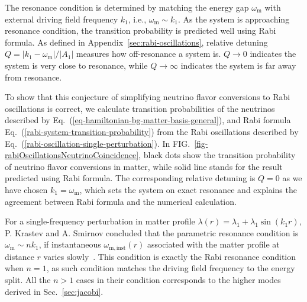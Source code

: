 \documentclass[%
reprint,
 amsmath,amssymb,
 aps,
]{revtex4-1}
\begin{document}
The resonance condition is determined by matching the energy gap $\omega_{\mathrm m}$ with external driving field frequency $k_1$, i.e., $\omega_{\mathrm m} \sim k_1$. As the system is approaching resonance condition, the transition probability is predicted well using Rabi formula. As defined in Appendix~\ref{sec:rabi-oscillations}, relative detuning $Q=\lvert k_1 - \omega_{\mathrm m} \rvert /\lvert A_1 \rvert$ measures how off-resonance a system is. $Q\to 0$ indicates the system is very close to resonance, while $Q\to \infty$ indicates the system is far away from resonance.


To show that this conjecture of simplifying neutrino flavor conversions to Rabi oscillations is correct, we calculate transition probabilities of the neutrinos described by Eq.~(\ref{eq-hamiltonian-bg-matter-basis-general}), and Rabi formula Eq.~(\ref{rabi-system-transition-probability}) from the Rabi oscillations described by Eq.~(\ref{rabi-oscillation-single-perturbation}).
In FIG.~\ref{fig-rabiOscillationsNeutrinoCoincidence}, black dots show the transition probability of neutrino flavor conversions in matter, while solid line stands for the result predicted using Rabi formula. The corresponding relative detuning is $Q = 0$ as we have chosen $k_1=\omega_{\mathrm{m}}$, which sets the system on exact resonance and explains the agreement between Rabi formula and the numerical calculation.

For a single-frequency perturbation in matter profile $\lambda(r) =\lambda_1 +  \lambda_1\sin(k_1 r)$, P. Krastev and A. Smirnov concluded that the parametric resonance condition is $\omega_{\mathrm{m}} \sim n k_1$, if instantaneous $\omega_{\mathrm{m,inst}}(r)$ associated with the matter profile at distance $r$ varies slowly~\cite{Krastev1989}. This condition is exactly the Rabi resonance condition when $n=1$, as such condition matches the driving field frequency to the energy split. All the $n>1$ cases in their condition corresponds to the higher modes derived in Sec.~\ref{sec:jacobi}.
\end{document}

